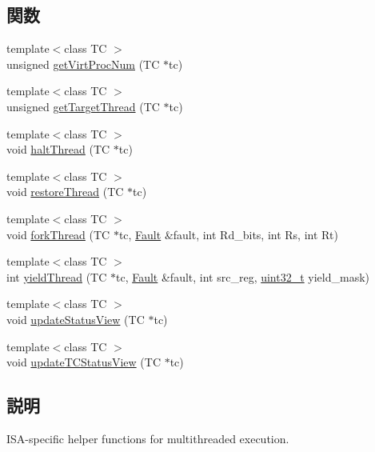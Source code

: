 \subsection*{関数}
\begin{DoxyCompactItemize}
\item 
{\footnotesize template$<$class TC $>$ }\\unsigned \hyperlink{namespaceMipsISA_ace8d9fa5b5b0e0df218ba5a8b8f4f257}{getVirtProcNum} (TC $\ast$tc)
\item 
{\footnotesize template$<$class TC $>$ }\\unsigned \hyperlink{namespaceMipsISA_ab8a7664b76486386dbdb999b696f28a7}{getTargetThread} (TC $\ast$tc)
\item 
{\footnotesize template$<$class TC $>$ }\\void \hyperlink{namespaceMipsISA_ae1180cae39b870a32a413b188c7b4c55}{haltThread} (TC $\ast$tc)
\item 
{\footnotesize template$<$class TC $>$ }\\void \hyperlink{namespaceMipsISA_a0b64a2b72e9387f553f74f650a403bc9}{restoreThread} (TC $\ast$tc)
\item 
{\footnotesize template$<$class TC $>$ }\\void \hyperlink{namespaceMipsISA_ac90786a66a67e08e3105a5b2f7e8e995}{forkThread} (TC $\ast$tc, \hyperlink{classRefCountingPtr}{Fault} \&fault, int Rd\_\-bits, int Rs, int Rt)
\item 
{\footnotesize template$<$class TC $>$ }\\int \hyperlink{namespaceMipsISA_a93f5e230d4726543a01ed483a2ea4070}{yieldThread} (TC $\ast$tc, \hyperlink{classRefCountingPtr}{Fault} \&fault, int src\_\-reg, \hyperlink{Type_8hh_a435d1572bf3f880d55459d9805097f62}{uint32\_\-t} yield\_\-mask)
\item 
{\footnotesize template$<$class TC $>$ }\\void \hyperlink{namespaceMipsISA_ad0ceebe8e2a7624b4522015586f786d5}{updateStatusView} (TC $\ast$tc)
\item 
{\footnotesize template$<$class TC $>$ }\\void \hyperlink{namespaceMipsISA_a14312b59ae8982e1caf5246e85b2c12b}{updateTCStatusView} (TC $\ast$tc)
\end{DoxyCompactItemize}


\subsection{説明}
ISA-\/specific helper functions for multithreaded execution. 